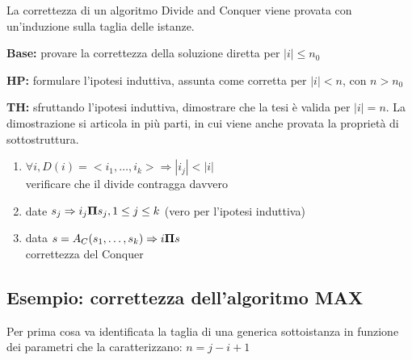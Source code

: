 La correttezza di un algoritmo Divide and Conquer viene provata con un'induzione sulla taglia delle istanze.

\begin{description}
    \item{\textbf{Base:}} provare la correttezza della soluzione diretta per $|i| \leq n_0$
    \item{\textbf{HP:}} formulare l'ipotesi induttiva, assunta come corretta per  $|i| < n$, con $n > n_0$
    \item{\textbf{TH:}} sfruttando l'ipotesi induttiva, dimostrare che la tesi è valida per $|i| = n$.
        La dimostrazione si articola in più parti, in cui viene anche provata la proprietà di sottostruttura.
        \begin{enumerate}[noitemsep,topsep=0pt,parsep=0pt,partopsep=0pt]
            \item $\forall i, D(i) = <i_1, \dots, i_k> \Rightarrow |i_j| < |i|$ \\
                verificare che il divide contragga davvero
            \item date $s_j \Rightarrow i_j \bm{\Pi}{} s_j, 1 \leq j \leq k$ (vero per l'ipotesi induttiva)
            \item data $s = A_C (s_1, \dots, s_k) \Rightarrow i \bm{\Pi}{} s$ \\
                correttezza del Conquer
        \end{enumerate}
\end{description}

\subsection{Esempio: correttezza dell'algoritmo MAX}

Per prima cosa va identificata la taglia di una generica sottoistanza in funzione dei parametri che la caratterizzano: $n=j-i+1$



